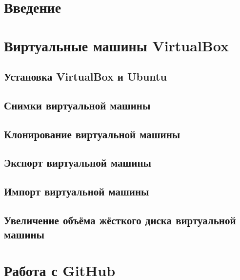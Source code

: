 \documentclass[oneside,final,14pt]{extarticle} %
\begin{document}


\setcounter{page}{2}

\setlength{\parindent}{1.25cm}

\tableofcontents
\newpage

\section*{Введение}

\newpage

\section{Виртуальные машины VirtualBox}
\subsection{Установка VirtualBox и Ubuntu}

\newpage

\subsection{Снимки виртуальной машины}

\newpage

\subsection{Клонирование виртуальной машины}

\newpage

\subsection{Экспорт виртуальной машины}

\newpage

\subsection{Импорт виртуальной машины}

\newpage

\subsection{Увеличение объёма жёсткого диска виртуальной машины}

\newpage

\section{Работа с GitHub}
\end{document}
